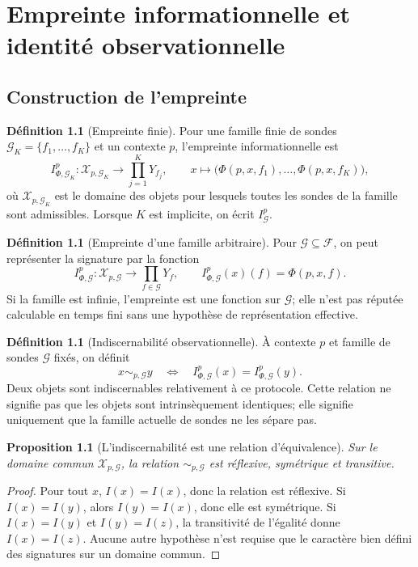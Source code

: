 \documentclass[11pt,oneside]{book}
\newtheorem{proposition}[theoreme]{Proposition}
\theoremstyle{definition}
\newtheorem{definition}[theoreme]{Définition}
\theoremstyle{remark}
\newcommand{\X}{\mathcal X}
\newcommand{\Fcal}{\mathcal F}
\newcommand{\Gcal}{\mathcal G}
\newcommand{\1}{\mathbf 1}
\begin{document}
\chapter{Empreinte informationnelle et identité observationnelle}
\section{Construction de l'empreinte}
\begin{definition}[Empreinte finie]
Pour une famille finie de sondes $\Gcal_K=\{f_1,\ldots,f_K\}$ et un contexte $p$, l'empreinte informationnelle est
\[
I_{\Phi,\Gcal_K}^{p}:\X_{p,\Gcal_K}\to\prod_{j=1}^{K}Y_{f_j},\qquad
x\mapsto\bigl(\Phi(p,x,f_1),\ldots,\Phi(p,x,f_K)\bigr),
\]
où $\X_{p,\Gcal_K}$ est le domaine des objets pour lesquels toutes les sondes de la famille sont admissibles. Lorsque $K$ est implicite, on écrit $I_{\Gcal}^{p}$.
\end{definition}

\begin{definition}[Empreinte d'une famille arbitraire]
Pour $\Gcal\subseteq\Fcal$, on peut représenter la signature par la fonction
\[
I_{\Phi,\Gcal}^{p}:\X_{p,\Gcal}\to\prod_{f\in\Gcal}Y_f,\qquad
I_{\Phi,\Gcal}^{p}(x)(f)=\Phi(p,x,f).
\]
Si la famille est infinie, l'empreinte est une fonction sur $\Gcal$; elle n'est pas réputée calculable en temps fini sans une hypothèse de représentation effective.
\end{definition}

\begin{definition}[Indiscernabilité observationnelle]
À contexte $p$ et famille de sondes $\Gcal$ fixés, on définit
\[
x\sim_{p,\Gcal}y\quad\Longleftrightarrow\quad I_{\Phi,\Gcal}^{p}(x)=I_{\Phi,\Gcal}^{p}(y).
\]
Deux objets sont indiscernables relativement à ce protocole. Cette relation ne signifie pas que les objets sont intrinsèquement identiques; elle signifie uniquement que la famille actuelle de sondes ne les sépare pas.
\end{definition}

\begin{proposition}[L'indiscernabilité est une relation d'équivalence]
Sur le domaine commun $\X_{p,\Gcal}$, la relation $\sim_{p,\Gcal}$ est réflexive, symétrique et transitive.
\end{proposition}
\begin{proof}
Pour tout $x$, $I(x)=I(x)$, donc la relation est réflexive. Si $I(x)=I(y)$, alors $I(y)=I(x)$, donc elle est symétrique. Si $I(x)=I(y)$ et $I(y)=I(z)$, la transitivité de l'égalité donne $I(x)=I(z)$. Aucune autre hypothèse n'est requise que le caractère bien défini des signatures sur un domaine commun.
\end{proof}
\end{document}
